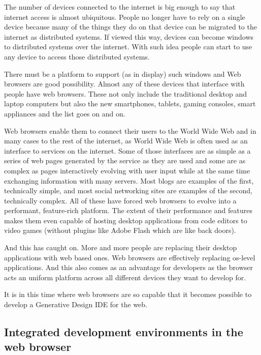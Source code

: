 \documentclass{./llncs2e/llncs}
\begin{document}
	The number of devices connected to the internet is big enough to say that internet access is almost ubiquitous.
	People no longer have to rely on a single device because many of the things they do on that device can be migrated to the internet as distributed systems.
	If viewed this way, devices can become windows to distributed systems over the internet.
	With such idea people can start to use any device to access those distributed systems.

	There must be a platform to support (as in display) such windows and Web browsers are good possibility.
	Almost any of these devices that interface with people have web browsers.
	These not only include the traditional desktop and laptop computers but also the new smartphones, tablets, gaming consoles, smart appliances and the list goes on and on.

	Web browsers enable them to connect their users to the World Wide Web and in many cases to the rest of the internet, as World Wide Web is often used as an interface to services on the internet.
	Some of those interfaces are as simple as a series of web pages generated by the service as they are used and some are as complex as pages interactively evolving with user input while at the same time exchanging information with many servers.
	Most blogs are examples of the first, technically simple, and most social networking sites are examples of the second, technically complex.
	All of these have forced web browsers to evolve into a performant, feature-rich platform.
	The extent of their performance and features makes them even capable of hosting desktop applications from code editors to video games (without plugins like Adobe Flash which are like back doors).

	And this has caught on.
	More and more people are replacing their desktop applications with web based ones.
	Web browsers are effectively replacing \ac{os}-level applications.
	And this also comes as an advantage for developers as the browser acts an uniform platform across all different devices they want to develop for.

	It is in this time where web browsers are so capable that it becomes possible to develop a Generative Design IDE for the web.

\subsection{Integrated development environments in the web browser}
\end{document}
